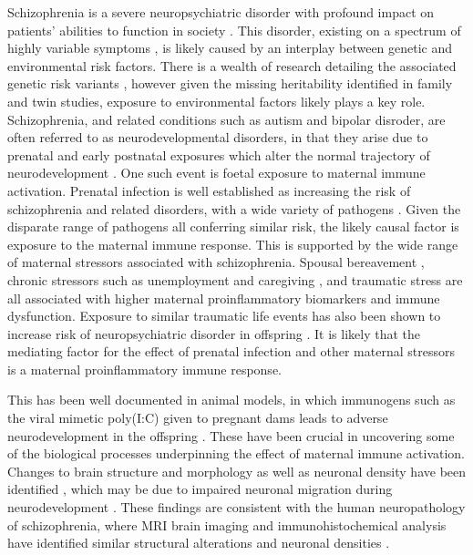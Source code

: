 \documentclass{bioinfo}
\begin{document}
\begin{introduction}
Schizophrenia is a severe neuropsychiatric disorder with profound impact on patients' abilities to function in society \citep{joyce_cognitive_2007, american_psychiatric_association_diagnostic_2013}. This disorder, existing on a spectrum of highly variable symptoms \citep{guloksuz_slow_2018}, is likely caused by an interplay between genetic and environmental risk factors. There is a wealth of research detailing the associated genetic risk variants \citep{ripke_biological_2014, marshall_contribution_2017, walsh_rare_2008}, however given the missing heritability identified in family and twin studies, exposure to environmental factors likely plays a key role. Schizophrenia, and related conditions such as autism and bipolar disroder, are often referred to as neurodevelopmental disorders, in that they arise due to prenatal and early postnatal exposures which alter the normal trajectory of neurodevelopment \citep{fatemi_neurodevelopmental_2009}. One such event is foetal exposure to maternal immune activation. Prenatal infection is well established as increasing the risk of schizophrenia and related disorders, with a wide variety of pathogens \citep{sorensen_association_2009, babulas_prenatal_2006, mortensen_toxoplasma_2007, buka_maternal_2008}. Given the disparate range of pathogens all conferring similar risk, the likely causal factor is exposure to the maternal immune response. This is supported by the wide range of maternal stressors associated with schizophrenia. Spousal bereavement \citep{fagundes_spousal_2018, jones_prospective_2015}, chronic stressors such as unemployment and caregiving \citep{kiecolt-glaser_childhood_2011, cohen_chronic_2012, kiecolt-glaser_chronic_2003}, and traumatic stress \citep{teche_resilience_2017, passos_inflammatory_2015} are all associated with higher maternal proinflammatory biomarkers and immune dysfunction. Exposure to similar traumatic life events has also been shown to increase risk of neuropsychiatric disorder in offspring \citep{khashan_higher_2008, susser_latent_2008, malaspina_acute_2008}. It is likely that the mediating factor for the effect of prenatal infection and other maternal stressors is a maternal proinflammatory immune response.

This has been well documented in animal models, in which immunogens such as the viral mimetic poly(I:C) given to pregnant dams leads to adverse neurodevelopment in the offspring \citep{brown_maternal_2018}. These have been crucial in uncovering some of the biological processes underpinning the effect of maternal immune activation. Changes to brain structure and morphology as well as neuronal density have been identified \citep{silveira_effects_2017, aavani_maternal_2015, canetta_maternal_2016, shin_yim_reversing_2017}, which may be due to impaired neuronal migration during neurodevelopment \citep{oskvig_maternal_2012, harvey_stereological_2012, meyer_adult_2008}. These findings are consistent with the human neuropathology of schizophrenia, where MRI brain imaging and immunohistochemical analysis have identified similar structural alterations and neuronal densities \citep{arnone_magnetic_2009, olabi_are_2011, smiley_hemispheric_2011}. 


\end{introduction}
\end{document}
